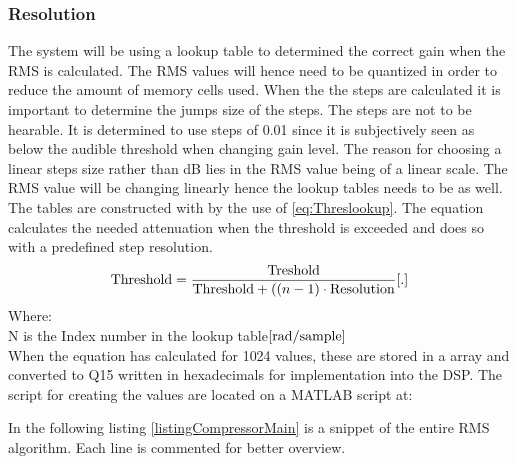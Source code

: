 \subsubsection*{Resolution}

The system will be using a lookup table to determined the correct gain when the RMS is calculated. The RMS values will hence need to be quantized in order to reduce the amount of memory cells used. When the the steps are calculated it is important to determine the jumps size of the steps. The steps are not to be hearable. It is determined to use steps of 0.01 since it is subjectively seen as below the audible threshold when changing gain level. The reason for choosing a linear steps size rather than dB lies in the RMS value being of a linear scale. The RMS value will be changing linearly hence the lookup tables needs to be as well. The tables are constructed with by the use of \autoref{eq:Threslookup}. The equation calculates the needed attenuation when the threshold is exceeded and does so with a predefined step resolution. 
\vspace{-2mm}
\begin{equation}\label{eq:Threslookup}
\text{Threshold}=\frac{\text{Treshold}}{\text{Threshold}+((n-1) \cdot \text{Resolution}}\enhed{.}
\end{equation}
Where:\\
N is the Index number in the lookup table$\enhed{rad/sample}$\\

\vspace{2mm}
When the equation has calculated for 1024 values, these are stored in a array and converted to Q15 written in hexadecimals for implementation into the DSP.
The script for creating the values are located on a MATLAB script at: \\

In the following listing \ref{listingCompressorMain} is a snippet of the entire RMS algorithm. Each line is commented for better overview.

